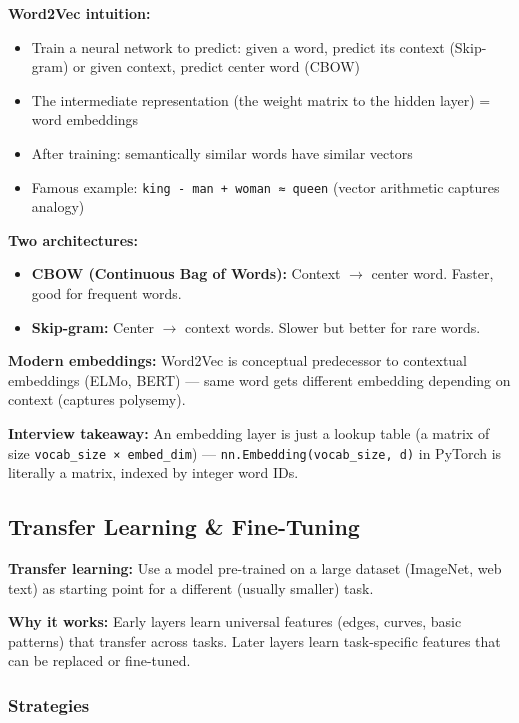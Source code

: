 \documentclass[11pt]{article}
\providecommand{\tightlist}{\setlength{\itemsep}{1pt}\setlength{\parskip}{0pt}}
\begin{document}
\textbf{Word2Vec intuition:}

\begin{itemize}
\tightlist
\item
  Train a neural network to predict: given a word, predict its context (Skip-gram) or given context, predict center word (CBOW)
\item
  The intermediate representation (the weight matrix to the hidden layer) = word embeddings
\item
  After training: semantically similar words have similar vectors
\item
  Famous example: \texttt{king\ -\ man\ +\ woman\ ≈\ queen} (vector arithmetic captures analogy)
\end{itemize}

\textbf{Two architectures:}

\begin{itemize}
\tightlist
\item
  \textbf{CBOW (Continuous Bag of Words):} Context \(\rightarrow\) center word. Faster, good for frequent words.
\item
  \textbf{Skip-gram:} Center \(\rightarrow\) context words. Slower but better for rare words.
\end{itemize}

\textbf{Modern embeddings:} Word2Vec is conceptual predecessor to contextual embeddings (ELMo, BERT) --- same word gets different embedding depending on context (captures polysemy).

\textbf{Interview takeaway:} An embedding layer is just a lookup table (a matrix of size \texttt{vocab\_size\ ×\ embed\_dim}) --- \texttt{nn.Embedding(vocab\_size,\ d)} in PyTorch is literally a matrix, indexed by integer word IDs.

\subsection{Transfer Learning \& Fine-Tuning}\label{transfer-learning--fine-tuning}

\textbf{Transfer learning:} Use a model pre-trained on a large dataset (ImageNet, web text) as starting point for a different (usually smaller) task.

\textbf{Why it works:} Early layers learn universal features (edges, curves, basic patterns) that transfer across tasks. Later layers learn task-specific features that can be replaced or fine-tuned.

\subsubsection{Strategies}\label{strategies}
\end{document}

